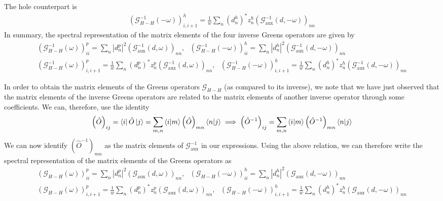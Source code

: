 \documentclass{report}
\numberwithin{equation}{section}
\begin{document}
The hole counterpart is
\begin{equation}\begin{aligned}
	\left(\mathcal{G}^{-1}_{H-H}\left(-\omega\right) \right)^h_{i,i+1} = \frac{1}{w} \sum_n \left(d^h_n\right)^* z^h_n \left(\mathcal{G}^{-1}_\text{aux}(d, -\omega) \right)_{nn}
\end{aligned}\end{equation}
In summary, the spectral representation of the matrix elements of the four inverse Greens operators are given by
\begin{gather}
\label{green_eq_final_siam}
	\left(\mathcal{G}^{-1}_{H-H}(\omega)\right)^p_{ii} = \sum_{n} |d^p_n|^2 \left(\mathcal{G}^{-1}_\text{aux}(d, \omega)\right)_{nn}, ~ ~ ~ \left(\mathcal{G}^{-1}_{H-H}(-\omega)\right)^h_{ii} = \sum_{n} |d^h_n|^2 \left(\mathcal{G}^{-1}_\text{aux}(d, -\omega)\right)_{nn}\\
	\left(\mathcal{G}^{-1}_{H-H}\left(\omega\right) \right)^p_{i,i+1} = \frac{1}{w} \sum_n \left(d^p_n\right)^* z^p_n \left(\mathcal{G}^{-1}_\text{aux}(d, \omega) \right)_{nn}, ~ ~ ~ \left(\mathcal{G}^{-1}_{H-H}\left(-\omega\right) \right)^h_{i,i+1} = \frac{1}{w} \sum_n \left(d^h_n\right)^* z^h_n \left(\mathcal{G}^{-1}_\text{aux}(d, -\omega) \right)_{nn}
\end{gather}

In order to obtain the matrix elements of the Greens operators \(\mathcal{G}_{H-H}\) (as compared to its inverse), we note that we have just observed that the matrix elements of the inverse Greens operators are related to the matrix elements of another inverse operator through some coefficients. We can, therefore, use the identity
\begin{equation}\begin{aligned}
\left(\hat O\right)_{ij} = \bra{i} \hat O \ket{j} = \sum_{m,n} \braket{i|m} \left(\hat O\right)_{mn} \braket{n|j} \implies \left(\hat O^{-1}\right)_{ij} = \sum_{m,n} \braket{i|m} \left(\hat O^{-1}\right)_{mn} \braket{n|j}
\end{aligned}\end{equation}
We can now identify \(\left(\hat O^{-1}\right)_{mn}\) as the matrix elements of \(\mathcal{G}_\text{aux}^{-1}\) in our expressions. Using the above relation, we can therefore write the spectral representation of the matrix elements of the Greens operators as 
\begin{gather}
	\left(\mathcal{G}_{H-H}(\omega)\right)^p_{ii} = \sum_{n} |d^p_n|^2 \left(\mathcal{G}_\text{aux}(d, \omega)\right)_{nn}, ~ ~ ~ \left(\mathcal{G}_{H-H}(-\omega)\right)^h_{ii} = \sum_{n} |d^h_n|^2 \left(\mathcal{G}_\text{aux}(d, -\omega)\right)_{nn}\\
	\left(\mathcal{G}_{H-H}\left(\omega\right) \right)^p_{i,i+1} = \frac{1}{w} \sum_n \left(d^p_n\right)^* z^p_n \left(\mathcal{G}_\text{aux}(d, \omega) \right)_{nn}, ~ ~ ~ \left(\mathcal{G}_{H-H}\left(-\omega\right) \right)^h_{i,i+1} = \frac{1}{w} \sum_n \left(d^h_n\right)^* z^h_n \left(\mathcal{G}_\text{aux}(d, -\omega) \right)_{nn}
\end{gather}
\end{document}
